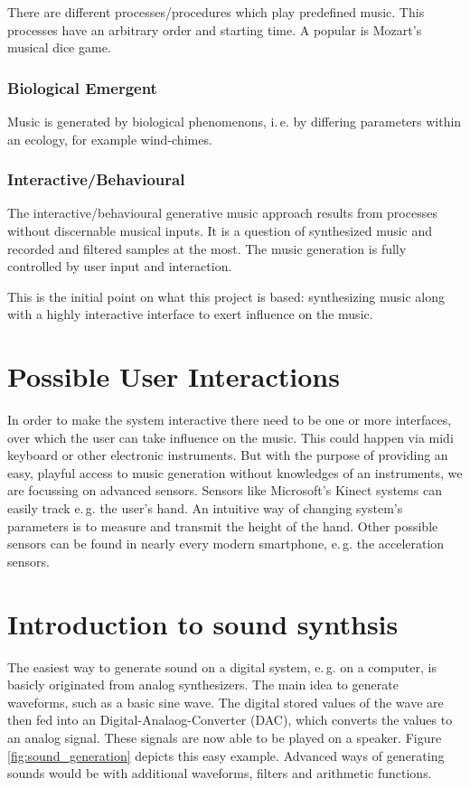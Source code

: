 	There are different processes/procedures which play predefined music. This processes have an arbitrary order and starting time. A popular is Mozart's musical dice game. 

	\subsubsection{Biological Emergent}

	Music is generated by biological phenomenons, i.\,e. by differing parameters within an ecology, for example wind-chimes.

	\subsubsection{Interactive/Behavioural}

	The interactive/behavioural generative music approach results from processes without discernable musical inputs. It is a question of synthesized music and recorded and filtered samples at the most. The music generation is fully controlled by user input and interaction.
	
	This is the initial point on what this project is based: synthesizing music along with a highly interactive interface to exert influence on the music.

	\section{Possible User Interactions}
	In order to make the system interactive there need to be one or more interfaces, over which the user can take influence on the music. This could happen via midi keyboard or other electronic instruments. But with the purpose of providing an easy, playful access to music generation without knowledges of an instruments, we are focussing on advanced sensors. Sensors like Microsoft's Kinect systems can easily track e.\,g. the user's hand. An intuitive way of changing system's parameters is to measure and transmit the height of the hand. Other possible sensors can be found in nearly every modern smartphone, e.\,g. the acceleration sensors.
	
			
				
	\section{Introduction to sound synthsis}
		The easiest way to generate sound on a digital system, e.\,g. on a computer, is basicly originated from analog synthesizers. The main idea to generate waveforms, such as a basic sine wave. The digital stored values of the wave are then fed into an Digital-Analaog-Converter (DAC), which converts the values to an analog signal. These signals are now able to be played on a speaker. Figure \ref{fig:sound_generation} depicts this easy example. Advanced ways of generating sounds would be with additional waveforms, filters and arithmetic functions.
	
